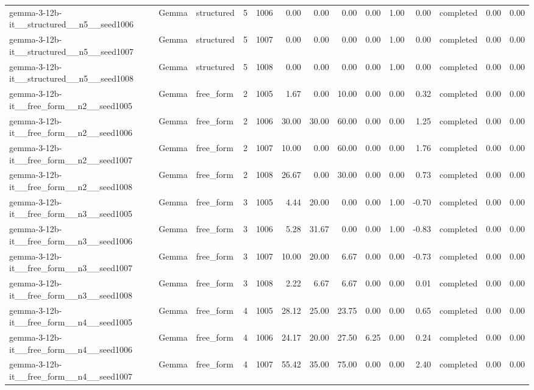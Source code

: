 \begin{longtable}{lllrrrrrrrrlrr}
gemma-3-12b-it\_\_structured\_\_n5\_\_seed1006 & Gemma & structured & 5 & 1006 & 0.00 & 0.00 & 0.00 & 0.00 & 1.00 & 0.00 & completed & 0.00 & 0.00 \\
gemma-3-12b-it\_\_structured\_\_n5\_\_seed1007 & Gemma & structured & 5 & 1007 & 0.00 & 0.00 & 0.00 & 0.00 & 1.00 & 0.00 & completed & 0.00 & 0.00 \\
gemma-3-12b-it\_\_structured\_\_n5\_\_seed1008 & Gemma & structured & 5 & 1008 & 0.00 & 0.00 & 0.00 & 0.00 & 1.00 & 0.00 & completed & 0.00 & 0.00 \\
gemma-3-12b-it\_\_free\_form\_\_n2\_\_seed1005 & Gemma & free\_form & 2 & 1005 & 1.67 & 0.00 & 10.00 & 0.00 & 0.00 & 0.32 & completed & 0.00 & 0.00 \\
gemma-3-12b-it\_\_free\_form\_\_n2\_\_seed1006 & Gemma & free\_form & 2 & 1006 & 30.00 & 30.00 & 60.00 & 0.00 & 0.00 & 1.25 & completed & 0.00 & 0.00 \\
gemma-3-12b-it\_\_free\_form\_\_n2\_\_seed1007 & Gemma & free\_form & 2 & 1007 & 10.00 & 0.00 & 60.00 & 0.00 & 0.00 & 1.76 & completed & 0.00 & 0.00 \\
gemma-3-12b-it\_\_free\_form\_\_n2\_\_seed1008 & Gemma & free\_form & 2 & 1008 & 26.67 & 0.00 & 30.00 & 0.00 & 0.00 & 0.73 & completed & 0.00 & 0.00 \\
gemma-3-12b-it\_\_free\_form\_\_n3\_\_seed1005 & Gemma & free\_form & 3 & 1005 & 4.44 & 20.00 & 0.00 & 0.00 & 1.00 & -0.70 & completed & 0.00 & 0.00 \\
gemma-3-12b-it\_\_free\_form\_\_n3\_\_seed1006 & Gemma & free\_form & 3 & 1006 & 5.28 & 31.67 & 0.00 & 0.00 & 1.00 & -0.83 & completed & 0.00 & 0.00 \\
gemma-3-12b-it\_\_free\_form\_\_n3\_\_seed1007 & Gemma & free\_form & 3 & 1007 & 10.00 & 20.00 & 6.67 & 0.00 & 0.00 & -0.73 & completed & 0.00 & 0.00 \\
gemma-3-12b-it\_\_free\_form\_\_n3\_\_seed1008 & Gemma & free\_form & 3 & 1008 & 2.22 & 6.67 & 6.67 & 0.00 & 0.00 & 0.01 & completed & 0.00 & 0.00 \\
gemma-3-12b-it\_\_free\_form\_\_n4\_\_seed1005 & Gemma & free\_form & 4 & 1005 & 28.12 & 25.00 & 23.75 & 0.00 & 0.00 & 0.65 & completed & 0.00 & 0.00 \\
gemma-3-12b-it\_\_free\_form\_\_n4\_\_seed1006 & Gemma & free\_form & 4 & 1006 & 24.17 & 20.00 & 27.50 & 6.25 & 0.00 & 0.24 & completed & 0.00 & 0.00 \\
gemma-3-12b-it\_\_free\_form\_\_n4\_\_seed1007 & Gemma & free\_form & 4 & 1007 & 55.42 & 35.00 & 75.00 & 0.00 & 0.00 & 2.40 & completed & 0.00 & 0.00 \\

\end{longtable}

